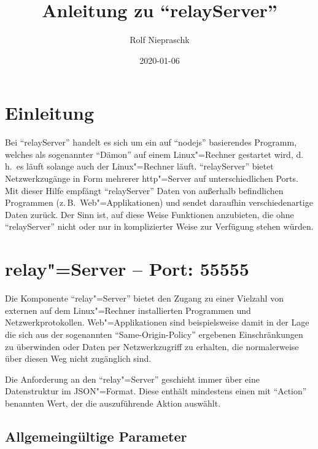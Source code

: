 \documentclass[titlepage=false,toc=nobibliography]{vl-report}
\newcommand*\theServer{relayServer}
\begin{document}
\subject{PTB~--~AG~7.54}
\title{Anleitung zu "`\theServer"'}
\date{2020-01-06}
\author{Rolf Niepraschk}

\maketitle

\section*{Einleitung}

Bei "`\theServer"' handelt es sich um ein auf "`nodejs"' basierendes
Programm, welches als sogenannter "`Dämon"' auf einem Linux"=Rechner
gestartet wird, d.\,h.\ es läuft solange auch der Linux"=Rechner läuft.
"`\theServer"' bietet Netzwerkzugänge in Form mehrerer
http"=Server auf unterschiedlichen Ports. Mit dieser Hilfe empfängt
"`\theServer"' Daten von außerhalb befindlichen Programmen (z.\,B.\
Web"=Applikationen) und sendet daraufhin verschiedenartige Daten zurück. Der
Sinn ist, auf diese Weise Funktionen anzubieten, die ohne "`\theServer"'
nicht oder nur in komplizierter Weise zur Verfügung stehen würden.

\section{relay"=Server -- Port: 55555}

Die Komponente "`relay"=Server"' bietet den Zugang zu einer Vielzahl von
externen auf dem Linux"=Rechner installierten Programmen und
Netzwerkprotokollen. Web"=Applikationen sind beispielsweise damit in der Lage
die sich aus der sogenannten "`Same-Origin-Policy"' ergebenen
Einschränkungen zu überwinden oder Daten per Netzwerkzugriff zu erhalten,
die normalerweise über diesen Weg nicht zugänglich sind.

Die Anforderung an den "`relay"=Server"' geschieht immer über eine
Datenstruktur im JSON"=Format. Diese enthält mindestens einen mit "`Action"'
benannten Wert, der die auszuführende Aktion auswählt.

\subsection{Allgemeingültige Parameter}
\end{document}
